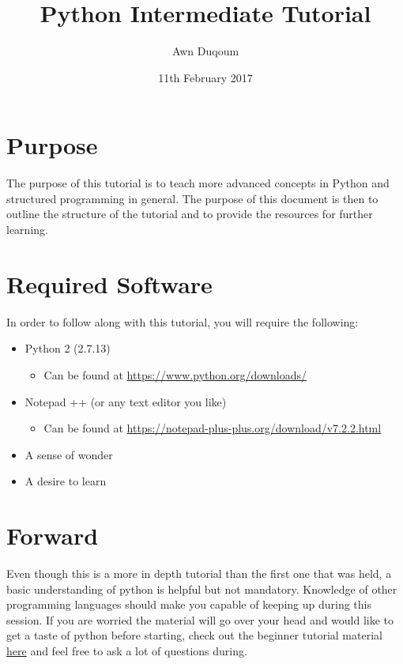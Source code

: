\documentclass{article}
\title{Python Intermediate Tutorial}
\author{Awn Duqoum}
\date{11th February 2017}
\begin{document}
\maketitle

\section{Purpose}

The purpose of this tutorial is to teach more advanced concepts in Python and structured programming in general. The purpose of this document is then to outline the structure of the tutorial and to provide the resources for further learning.

\section{Required Software}

In order to follow along with this tutorial, you will require the following: 

\begin{itemize}
    \item Python 2 (2.7.13)
    \begin{itemize}
        \item Can be found at \url{https://www.python.org/downloads/}
    \end{itemize}
    \item Notepad ++ (or any text editor you like)
        \begin{itemize}
        \item Can be found  at \url{https://notepad-plus-plus.org/download/v7.2.2.html}
        \end{itemize}
    \item A sense of wonder
    \item A desire to learn 
\end{itemize}

\section{Forward}
Even though this is a more in depth tutorial than the first one that was held, a basic understanding of python is helpful but not mandatory. Knowledge of other programming languages should make you capable of keeping up during this session. If you are worried the material will go over your head and would like to get a taste of python before starting, check out the beginner tutorial material \href{https://goo.gl/0DTrgb}{here} and feel free to ask a lot of questions during.
\end{document}
